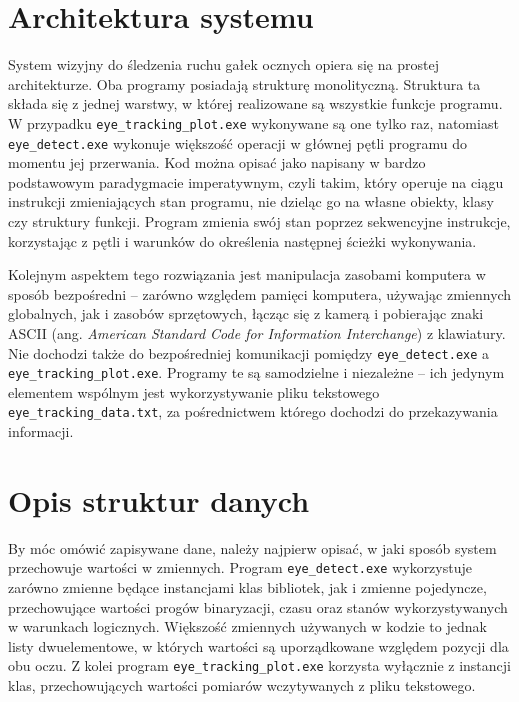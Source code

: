 \documentclass[a4paper,twoside,12pt]{book}
\newcommand{\obcy}[1]{\emph{#1}}
\newcommand{\english}[1]{{\selectlanguage{british}\obcy{#1}}}
\begin{document}
\section{Architektura systemu}
\label{sec:Architektura-systemu}

System wizyjny do śledzenia ruchu gałek ocznych opiera się na prostej architekturze. Oba programy posiadają strukturę monolityczną. Struktura ta składa się z jednej warstwy, w której realizowane są wszystkie funkcje programu. W przypadku \texttt{eye\_\-tracking\_\-plot.exe} wykonywane są one tylko raz, natomiast \texttt{eye\-\_detect.exe} wykonuje większość operacji w głównej pętli programu do momentu jej przerwania. Kod można opisać jako napisany w bardzo podstawowym paradygmacie imperatywnym, czyli takim, który operuje na ciągu instrukcji zmieniających stan programu, nie dzieląc go na własne obiekty, klasy czy struktury funkcji. Program zmienia swój stan poprzez sekwencyjne instrukcje, korzystając z pętli i warunków do określenia następnej ścieżki wykonywania.

Kolejnym aspektem tego rozwiązania jest manipulacja zasobami komputera w sposób bezpośredni -- zarówno względem pamięci komputera, używając zmiennych globalnych, jak i zasobów sprzętowych, łącząc się z kamerą i pobierając znaki ASCII (ang. \english{American Standard Code for Information Interchange}) z klawiatury. Nie dochodzi także do bezpośredniej komunikacji pomiędzy \texttt{eye\-\_detect.exe} a \texttt{eye\_\-tracking\_\-plot.exe}. Programy te są samodzielne i niezależne -- ich jedynym elementem wspólnym jest wykorzystywanie pliku tekstowego \texttt{eye\_tracking\_data.txt}, za pośrednictwem którego dochodzi do przekazywania informacji.

\section{Opis struktur danych}
\label{sec:Opis-struktury-danych}

By móc omówić zapisywane dane, należy najpierw opisać, w jaki sposób system przechowuje wartości w zmiennych. Program \texttt{eye\-\_detect\-.exe} wykorzystuje zarówno zmienne będące instancjami klas bibliotek, jak i zmienne pojedyncze, przechowujące wartości progów binaryzacji, czasu oraz stanów wykorzystywanych w warunkach logicznych. Większość zmiennych używanych w kodzie to jednak listy dwuelementowe, w których wartości są uporządkowane względem pozycji dla obu oczu. Z kolei program \texttt{eye\_\-tracking\_\-plot\-.exe} korzysta wyłącznie z instancji klas, przechowujących wartości pomiarów wczytywanych z pliku tekstowego.
\end{document}
